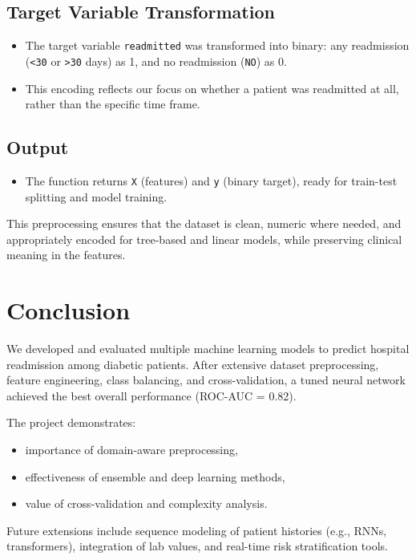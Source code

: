 \documentclass[11pt]{article}
\begin{document}
\subsection{Target Variable Transformation}
\begin{itemize}
    \item The target variable \texttt{readmitted} was transformed into binary: any readmission (\texttt{<30} or \texttt{>30} days) as 1, and no readmission (\texttt{NO}) as 0.  
    \item This encoding reflects our focus on whether a patient was readmitted at all, rather than the specific time frame.
\end{itemize}

\subsection{Output}
\begin{itemize}
    \item The function returns \texttt{X} (features) and \texttt{y} (binary target), ready for train-test splitting and model training.
\end{itemize}

This preprocessing ensures that the dataset is clean, numeric where needed, and appropriately encoded for tree-based and linear models, while preserving clinical meaning in the features.

\section{Conclusion}

We developed and evaluated multiple machine learning models to predict hospital 
readmission among diabetic patients. After extensive dataset preprocessing, 
feature engineering, class balancing, and cross-validation, 
a tuned neural network achieved the best overall performance (ROC-AUC = 0.82). 

The project demonstrates:
\begin{itemize}
    \item importance of domain-aware preprocessing,
    \item effectiveness of ensemble and deep learning methods,
    \item value of cross-validation and complexity analysis.
\end{itemize}

Future extensions include sequence modeling of patient histories 
(e.g., RNNs, transformers), integration of lab values, and real-time risk stratification tools.
\end{document}
